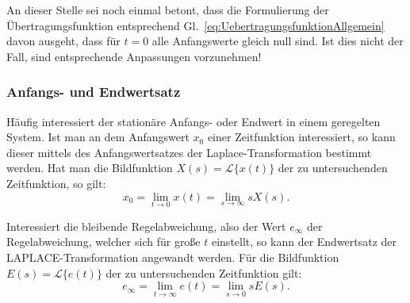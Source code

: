 \begin{RstWichtigBox}
  An dieser Stelle sei noch einmal betont, dass die Formulierung der Übertragungsfunktion entsprechend Gl.~\eqref{eq:UebertragungsfunktionAllgemein} davon ausgeht, dass für $t=0$ alle Anfangswerte gleich null sind. Ist dies nicht der Fall, sind entsprechende Anpassungen vorzunehmen!
\end{RstWichtigBox}


\subsubsection{Anfangs- und Endwertsatz} \label{sec:endwertsatze}
Häufig interessiert der stationäre Anfangs- oder Endwert in einem geregelten System. Ist man an dem Anfangswert $x_0$ einer Zeitfunktion interessiert, so kann dieser mittels des
Anfangswertsatzes der Laplace-Transformation bestimmt werden. Hat man die Bildfunktion $X(s) = \mathcal{L}\{x(t)\}$ der zu untersuchenden Zeitfunktion, so gilt:
\begin{equation} \label{eq:Anfangswertsatz}
  x_0 = \lim_{t \to 0} x(t) = \lim_{s \to \infty} s X(s).
\end{equation}

Interessiert die bleibende Regelabweichung, also der Wert $e_\infty$ der Regelabweichung, welcher sich für große $t$ einstellt, so kann der Endwertsatz der LAPLACE-Transformation angewandt werden. Für die Bildfunktion $E(s) = \mathcal{L}\{e(t)\}$ der zu untersuchenden Zeitfunktion gilt:
\begin{equation}\label{eq:Endwertsatz}
  e_\infty = \lim_{t \to \infty} e(t) = \lim_{s \to 0} s E(s).
\end{equation}




